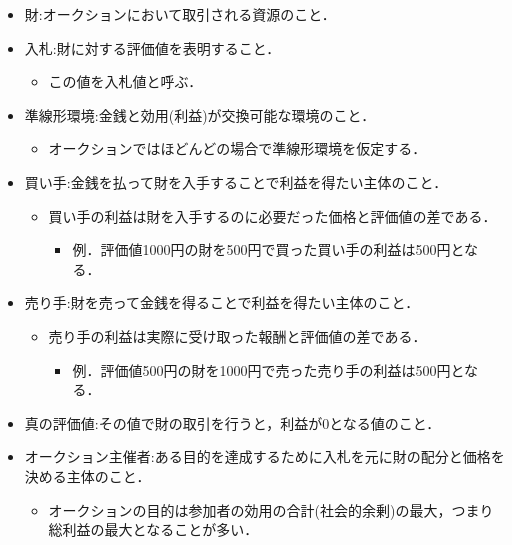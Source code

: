 \begin{itemize}
\tightlist
\item
  財:オークションにおいて取引される資源のこと．
\item
  入札:財に対する評価値を表明すること．

  \begin{itemize}
  \tightlist
  \item
    この値を入札値と呼ぶ．
  \end{itemize}
\item
  準線形環境:金銭と効用(利益)が交換可能な環境のこと．

  \begin{itemize}
  \tightlist
  \item
    オークションではほどんどの場合で準線形環境を仮定する．
  \end{itemize}
\item
  買い手:金銭を払って財を入手することで利益を得たい主体のこと．

  \begin{itemize}
  \tightlist
  \item
    買い手の利益は財を入手するのに必要だった価格と評価値の差である．

    \begin{itemize}
    \tightlist
    \item
      例．評価値1000円の財を500円で買った買い手の利益は500円となる．
    \end{itemize}
  \end{itemize}
\item
  売り手:財を売って金銭を得ることで利益を得たい主体のこと．

  \begin{itemize}
  \tightlist
  \item
    売り手の利益は実際に受け取った報酬と評価値の差である．

    \begin{itemize}
    \tightlist
    \item
      例．評価値500円の財を1000円で売った売り手の利益は500円となる．
    \end{itemize}
  \end{itemize}
\item
  真の評価値:その値で財の取引を行うと，利益が0となる値のこと．
\item
  オークション主催者:ある目的を達成するために入札を元に財の配分と価格を決める主体のこと．

  \begin{itemize}
  \tightlist
  \item
    オークションの目的は参加者の効用の合計(社会的余剰)の最大，つまり総利益の最大となることが多い．
  \end{itemize}
\end{itemize}

